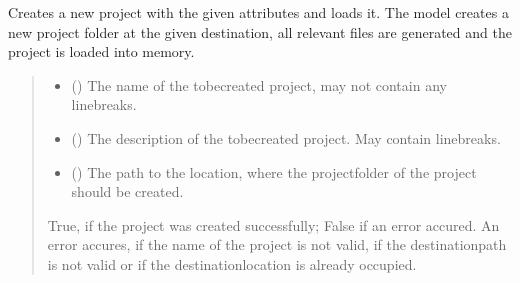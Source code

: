 \documentclass[letterpaper,10pt,english]{sphinxmanual}
\begin{document}
\begin{fulllineitems}
\begin{fulllineitems}
\label{\detokenize{apidoc/src.osm_configurator.control:src.osm_configurator.control.control.Control.create_project}}
\pysigstartsignatures
{}
\pysigstopsignatures
\sphinxAtStartPar
Creates a new project with the given attributes and loads it.
The model creates a new project folder at the given destination, all relevant files are generated and the project is loaded into memory.
\begin{quote}\begin{description}
\begin{itemize}
\item {} 
\sphinxAtStartPar
{} () \textendash{} The name of the to\sphinxhyphen{}be\sphinxhyphen{}created project, may not contain any line\sphinxhyphen{}breaks.

\item {} 
\sphinxAtStartPar
{} () \textendash{} The description of the to\sphinxhyphen{}be\sphinxhyphen{}created project. May contain line\sphinxhyphen{}breaks.

\item {} 
\sphinxAtStartPar
{} () \textendash{} The path to the location, where the projectfolder of the project should be created.

\end{itemize}

\sphinxAtStartPar
True, if the project was created successfully; False if an error accured. An error accures, if the name of the project is not valid, if the destination\sphinxhyphen{}path is not valid or if the destination\sphinxhyphen{}location is already occupied.

\sphinxAtStartPar
{}


\end{description}
\end{quote}
\end{fulllineitems}
\end{fulllineitems}
\end{document}
